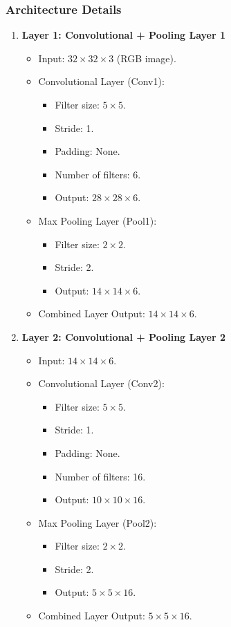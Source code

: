 \documentclass[letterpaper,12pt,notitlepage,twoside]{report}
\begin{document}
\subsubsection*{Architecture Details}
\begin{enumerate}[nosep]
    \item \textbf{Layer 1: Convolutional + Pooling Layer 1}
    \begin{itemize}
        \item Input: $32 \times 32 \times 3$ (RGB image).
        \item Convolutional Layer (Conv1):
        \begin{itemize}
            \item Filter size: $5 \times 5$.
            \item Stride: 1.
            \item Padding: None.
            \item Number of filters: 6.
            \item Output: $28 \times 28 \times 6$.
        \end{itemize}
        \item Max Pooling Layer (Pool1):
        \begin{itemize}
            \item Filter size: $2 \times 2$.
            \item Stride: 2.
            \item Output: $14 \times 14 \times 6$.
        \end{itemize}
        \item Combined Layer Output: $14 \times 14 \times 6$.
    \end{itemize}

    \item \textbf{Layer 2: Convolutional + Pooling Layer 2}
    \begin{itemize}
        \item Input: $14 \times 14 \times 6$.
        \item Convolutional Layer (Conv2):
        \begin{itemize}
            \item Filter size: $5 \times 5$.
            \item Stride: 1.
            \item Padding: None.
            \item Number of filters: 16.
            \item Output: $10 \times 10 \times 16$.
        \end{itemize}
        \item Max Pooling Layer (Pool2):
        \begin{itemize}
            \item Filter size: $2 \times 2$.
            \item Stride: 2.
            \item Output: $5 \times 5 \times 16$.
        \end{itemize}
        \item Combined Layer Output: $5 \times 5 \times 16$.
    \end{itemize}


\end{enumerate}
\end{document}
